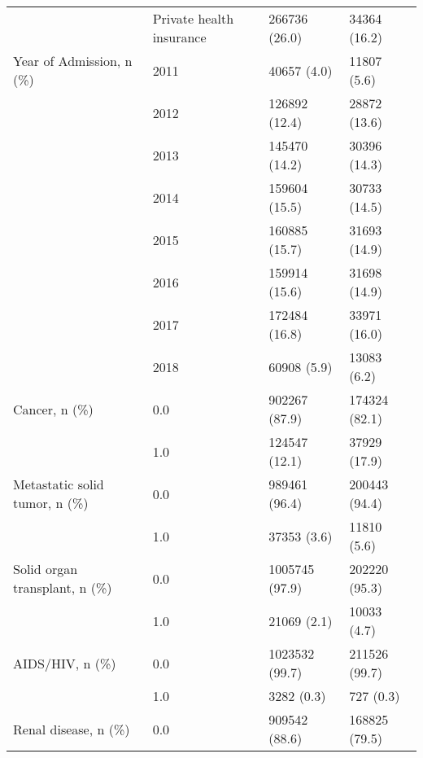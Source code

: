 \begin{tabular}{llll}
                                       & Private health insurance &                         266736 (26.0) &       34364 (16.2) \\
Year of Admission, n (\%) & 2011 &                           40657 (4.0) &        11807 (5.6) \\
                                       & 2012 &                         126892 (12.4) &       28872 (13.6) \\
                                       & 2013 &                         145470 (14.2) &       30396 (14.3) \\
                                       & 2014 &                         159604 (15.5) &       30733 (14.5) \\
                                       & 2015 &                         160885 (15.7) &       31693 (14.9) \\
                                       & 2016 &                         159914 (15.6) &       31698 (14.9) \\
                                       & 2017 &                         172484 (16.8) &       33971 (16.0) \\
                                       & 2018 &                           60908 (5.9) &        13083 (6.2) \\
Cancer, n (\%) & 0.0 &                         902267 (87.9) &      174324 (82.1) \\
                                       & 1.0 &                         124547 (12.1) &       37929 (17.9) \\
Metastatic solid tumor, n (\%) & 0.0 &                         989461 (96.4) &      200443 (94.4) \\
                                       & 1.0 &                           37353 (3.6) &        11810 (5.6) \\
Solid organ transplant, n (\%) & 0.0 &                        1005745 (97.9) &      202220 (95.3) \\
                                       & 1.0 &                           21069 (2.1) &        10033 (4.7) \\
AIDS/HIV, n (\%) & 0.0 &                        1023532 (99.7) &      211526 (99.7) \\
                                       & 1.0 &                            3282 (0.3) &          727 (0.3) \\
Renal disease, n (\%) & 0.0 &                         909542 (88.6) &      168825 (79.5) \\

\end{tabular}
